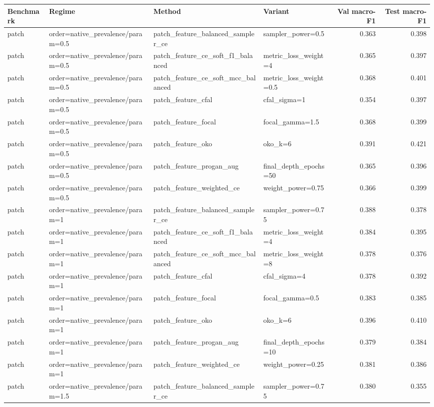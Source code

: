 \begin{tabular}{llllrr}
\toprule
Benchmark & Regime & Method & Variant & Val macro-F1 & Test macro-F1\\
\midrule
patch & order=native_prevalence/param=0.5 & patch_feature_balanced_sampler_ce & sampler_power=0.5 & 0.363 & 0.398\\
patch & order=native_prevalence/param=0.5 & patch_feature_ce_soft_f1_balanced & metric_loss_weight=4 & 0.365 & 0.397\\
patch & order=native_prevalence/param=0.5 & patch_feature_ce_soft_mcc_balanced & metric_loss_weight=0.5 & 0.368 & 0.401\\
patch & order=native_prevalence/param=0.5 & patch_feature_cfal & cfal_sigma=1 & 0.354 & 0.397\\
patch & order=native_prevalence/param=0.5 & patch_feature_focal & focal_gamma=1.5 & 0.368 & 0.399\\
patch & order=native_prevalence/param=0.5 & patch_feature_oko & oko_k=6 & 0.391 & 0.421\\
patch & order=native_prevalence/param=0.5 & patch_feature_progan_aug & final_depth_epochs=50 & 0.365 & 0.396\\
patch & order=native_prevalence/param=0.5 & patch_feature_weighted_ce & weight_power=0.75 & 0.366 & 0.399\\
patch & order=native_prevalence/param=1 & patch_feature_balanced_sampler_ce & sampler_power=0.75 & 0.388 & 0.378\\
patch & order=native_prevalence/param=1 & patch_feature_ce_soft_f1_balanced & metric_loss_weight=4 & 0.384 & 0.395\\
patch & order=native_prevalence/param=1 & patch_feature_ce_soft_mcc_balanced & metric_loss_weight=8 & 0.378 & 0.376\\
patch & order=native_prevalence/param=1 & patch_feature_cfal & cfal_sigma=4 & 0.378 & 0.392\\
patch & order=native_prevalence/param=1 & patch_feature_focal & focal_gamma=0.5 & 0.383 & 0.385\\
patch & order=native_prevalence/param=1 & patch_feature_oko & oko_k=6 & 0.396 & 0.410\\
patch & order=native_prevalence/param=1 & patch_feature_progan_aug & final_depth_epochs=10 & 0.379 & 0.384\\
patch & order=native_prevalence/param=1 & patch_feature_weighted_ce & weight_power=0.25 & 0.381 & 0.386\\
patch & order=native_prevalence/param=1.5 & patch_feature_balanced_sampler_ce & sampler_power=0.75 & 0.380 & 0.355\\

\end{tabular}
